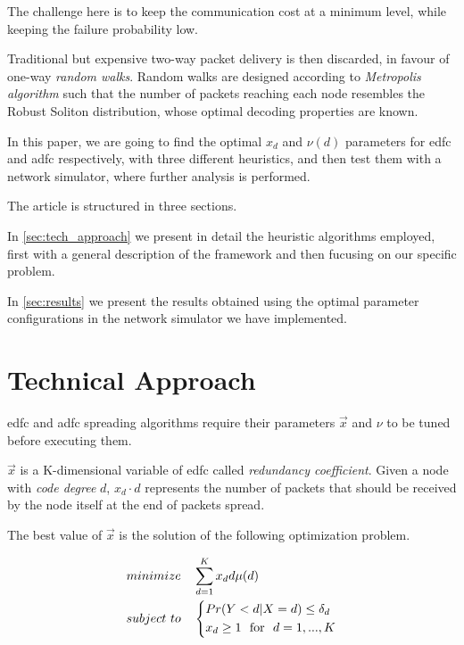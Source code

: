 \documentclass[journal]{IEEEtran}
\begin{document}
The challenge here is to keep the communication cost at a minimum level, while keeping the failure probability low.

Traditional but expensive two-way packet delivery is then discarded, in favour of one-way \emph{random walks}.
Random walks are designed according to \emph{Metropolis algorithm} such that the number of packets reaching each node resembles the Robust Soliton distribution, whose optimal decoding properties are known\cite{Luby}.

In this paper, we are going to find the optimal $x_d$ and $\nu(d)$ parameters for \gls{edfc} and \gls{adfc} respectively, with three different heuristics, and then test them with a network simulator, where further analysis is performed.

The article is structured in three sections.

In \autoref{sec:tech_approach} we present in detail the heuristic algorithms employed, first with a general description of the framework and then fucusing on our specific problem.

In \autoref{sec:results} we present the results obtained using the optimal parameter configurations in the network simulator we have implemented.

\section{Technical Approach}
\label{sec:tech_approach}

\gls{edfc} and \gls{adfc} spreading algorithms require their parameters $\vec{x}$ and $\nu$ to be tuned before executing them.

$\vec{x}$ is a K-dimensional variable of \gls{edfc} called \emph{redundancy coefficient}. Given a node with \emph{code degree} $d$, $x_d \cdot d$ represents the number of packets that should be received by the node itself at the end of packets spread.

The best value of $\vec{x}$ is the solution of the following optimization problem\cite{Lin2007}.

\begin{equation}
	\label{firstproblem}
	\begin{split}
		minimize & \quad \sum_{d=1}^K x_d d \mu (d) \\
		subject \ to & \quad \begin{dcases}
			Pr(Y<d|X=d) \leq \delta_d \\
			x_d \geq 1 \text{ ~for~ } d = 1,...,K
		\end{dcases}
	\end{split}
\end{equation}
\end{document}

